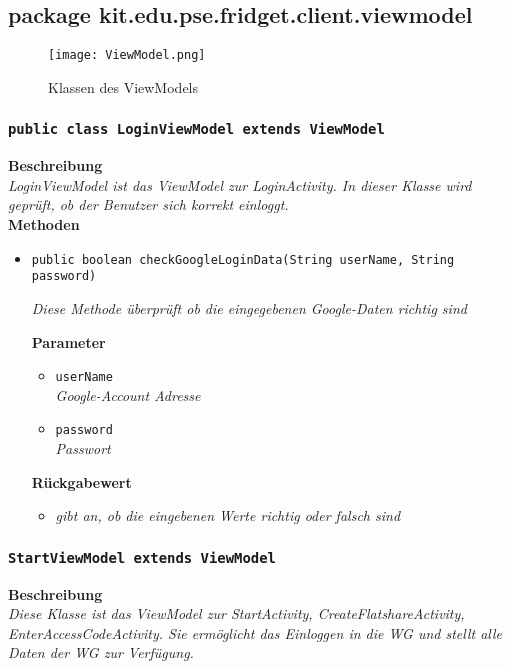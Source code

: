 		\subsection{package kit.edu.pse.fridget.client.viewmodel}
		\begin{figure}[H]
	       \centering
	       \texttt{[image: ViewModel.png]}
	       \caption{Klassen des ViewModels}
	      \end{figure}
      
		\subsubsection{\texttt{public class LoginViewModel extends ViewModel}}
		\textbf{Beschreibung} \\
        \textit{LoginViewModel ist das ViewModel zur LoginActivity. In dieser Klasse wird geprüft, ob der Benutzer sich korrekt einloggt.}\\
        
		\textbf{Methoden}
 			\begin{itemize}
        		\item{\texttt{public boolean checkGoogleLoginData(String userName, String password)}}
        	
        		\textit{Diese Methode überprüft ob die eingegebenen Google-Daten richtig sind}
        	
        		\textbf{Parameter}
        		\begin{itemize}
        			\item\texttt{userName}\\ 
        			\textit{Google-Account Adresse}
        			\item\texttt{password}\\ 
        			\textit{Passwort}
        		\end{itemize}

				\textbf{Rückgabewert}
				\begin{itemize} 
					\item\textit{gibt an, ob die eingebenen Werte richtig oder falsch sind}
				\end{itemize}
			
			\end{itemize}
   
   
       \subsubsection{\texttt{StartViewModel extends ViewModel}}
       \textbf{Beschreibung} \\
        \textit{Diese Klasse ist das ViewModel zur StartActivity, CreateFlatshareActivity, EnterAccessCodeActivity. Sie ermöglicht das Einloggen in die WG und stellt alle Daten der WG zur Verfügung.}\\
        
